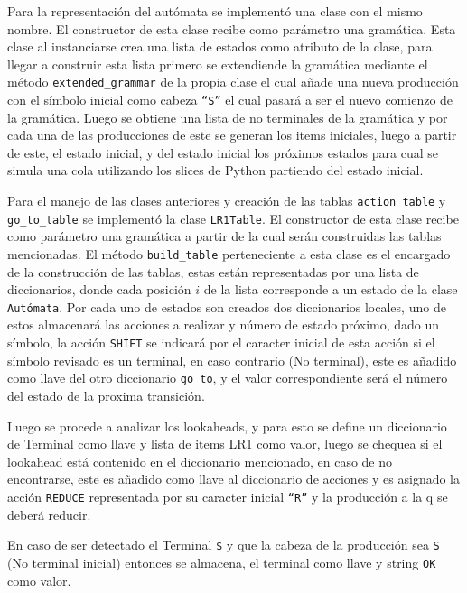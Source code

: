 \documentclass[twoside]{article}
\begin{document}
		Para la representaci\'on del aut\'omata se implement\'o una clase con el mismo nombre. El constructor de esta clase recibe como par\'ametro una gram\'atica. Esta clase al instanciarse crea una lista de estados como atributo de la clase, para llegar a construir esta lista primero se extendiende la gram\'atica mediante el m\'etodo \texttt{extended\_grammar} de la propia clase el cual a\~nade una nueva producci\'on con el s\'imbolo inicial como cabeza \texttt{``S''} el cual pasar\'a a ser el nuevo comienzo de la gram\'atica. Luego se obtiene una lista de no terminales de la gram\'atica y por cada una de las producciones de este se generan los items iniciales, luego a partir de este, el estado inicial, y del estado inicial los pr\'oximos estados para cual se simula una cola utilizando los slices de Python partiendo del estado inicial.
		
		
		Para el manejo de las clases anteriores y creaci\'on de las tablas \texttt{action\_table} y \texttt{go\_to\_table} se implement\'o la clase \texttt{LR1Table}. El constructor de esta clase recibe como par\'ametro una gram\'atica a partir de la cual ser\'an construidas las tablas mencionadas. El m\'etodo \texttt{build\_table} perteneciente a esta clase es el encargado de la construcción de las tablas, estas est\'an representadas por una lista de diccionarios, donde cada posici\'on $i$ de la lista corresponde a un estado de la clase \texttt{Aut\'omata}. Por cada uno de estados son creados dos diccionarios locales, uno de estos almacenar\'a las acciones a realizar y n\'umero de estado pr\'oximo, dado un s\'imbolo, la acci\'on \texttt{SHIFT} se indicar\'a por el caracter inicial de esta acci\'on si el s\'imbolo revisado es un terminal, en caso contrario (No terminal), este es a\~nadido como llave del otro diccionario \texttt{go\_to}, y el valor correspondiente ser\'a el n\'umero del estado de la proxima transici\'on.
		
		Luego se procede a analizar los lookaheads, y para esto se define un diccionario de Terminal como llave y lista de items LR1 como valor, luego se chequea si el lookahead est\'a contenido en el diccionario mencionado, en caso de no encontrarse, este es a\~nadido como llave al diccionario de acciones y es asignado la acci\'on \texttt{REDUCE} representada por su caracter inicial \texttt{``R''}  y la producci\'on a la q se deber\'a reducir.
		
		En caso de ser detectado el Terminal \texttt{\$} y que la cabeza de la producci\'on sea \texttt{S} (No terminal inicial) entonces se almacena, el terminal como llave y string \texttt{OK} como valor.
				
\end{document}
